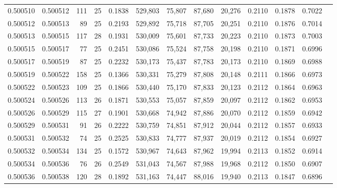 \begin{tabular}{rrrrrrrrrrrrr}
0.500510 & 0.500512 & 111 &  25 &                                     0.1838 & 529,803 &  75,807 &  87,680 &  20,276 & 0.2110 & 0.1878 & 0.7022 \\
0.500512 & 0.500513 &  89 &  25 &                                     0.2193 & 529,892 &  75,718 &  87,705 &  20,251 & 0.2110 & 0.1876 & 0.7014 \\
0.500513 & 0.500515 & 117 &  28 &                                     0.1931 & 530,009 &  75,601 &  87,733 &  20,223 & 0.2110 & 0.1873 & 0.7003 \\
0.500515 & 0.500517 &  77 &  25 &                                     0.2451 & 530,086 &  75,524 &  87,758 &  20,198 & 0.2110 & 0.1871 & 0.6996 \\
0.500517 & 0.500519 &  87 &  25 &                                     0.2232 & 530,173 &  75,437 &  87,783 &  20,173 & 0.2110 & 0.1869 & 0.6988 \\
0.500519 & 0.500522 & 158 &  25 &                                     0.1366 & 530,331 &  75,279 &  87,808 &  20,148 & 0.2111 & 0.1866 & 0.6973 \\
0.500522 & 0.500523 & 109 &  25 &                                     0.1866 & 530,440 &  75,170 &  87,833 &  20,123 & 0.2112 & 0.1864 & 0.6963 \\
0.500524 & 0.500526 & 113 &  26 &                                     0.1871 & 530,553 &  75,057 &  87,859 &  20,097 & 0.2112 & 0.1862 & 0.6953 \\
0.500526 & 0.500529 & 115 &  27 &                                     0.1901 & 530,668 &  74,942 &  87,886 &  20,070 & 0.2112 & 0.1859 & 0.6942 \\
0.500529 & 0.500531 &  91 &  26 &                                     0.2222 & 530,759 &  74,851 &  87,912 &  20,044 & 0.2112 & 0.1857 & 0.6933 \\
0.500531 & 0.500532 &  74 &  25 &                                     0.2525 & 530,833 &  74,777 &  87,937 &  20,019 & 0.2112 & 0.1854 & 0.6927 \\
0.500532 & 0.500534 & 134 &  25 &                                     0.1572 & 530,967 &  74,643 &  87,962 &  19,994 & 0.2113 & 0.1852 & 0.6914 \\
0.500534 & 0.500536 &  76 &  26 &                                     0.2549 & 531,043 &  74,567 &  87,988 &  19,968 & 0.2112 & 0.1850 & 0.6907 \\
0.500536 & 0.500538 & 120 &  28 &                                     0.1892 & 531,163 &  74,447 &  88,016 &  19,940 & 0.2113 & 0.1847 & 0.6896 \\

\end{tabular}
